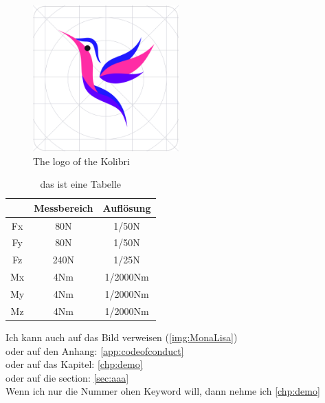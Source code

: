 \begin{figure}[H]
    \centering
    \includegraphics[width=0.5\textwidth]{./mainmatter/pictures/Demo/kolibri-logo}
    \caption{The logo of the Kolibri}
    \label{Kolibri}
\end{figure}


\begin{table}[H]
\centering
\begin{tabular}{|c|c|c|}
	\hline & Messbereich & Auflösung\\ 
	\hline Fx & 80N   & 1/50N\\ 
	\hline Fy & 80N   & 1/50N\\ 
	\hline Fz & 240N  & 1/25N\\ 
	\hline Mx & 4Nm   & 1/2000Nm\\ 
	\hline My & 4Nm   & 1/2000Nm\\ 
	\hline Mz & 4Nm   & 1/2000Nm\\
	\hline 
\end{tabular} 
\caption{das ist eine Tabelle}
\label{tbl:Tabelle}
\end{table}


Ich kann auch auf das Bild verweisen (\autoref{img:MonaLisa})\\
oder auf den Anhang: \autoref{app:codeofconduct} \\
oder auf das Kapitel: \autoref{chp:demo}\\
oder auf die section: \autoref{sec:aaa}\\
Wenn ich nur die Nummer ohen Keyword will, dann nehme ich \ref{chp:demo}
